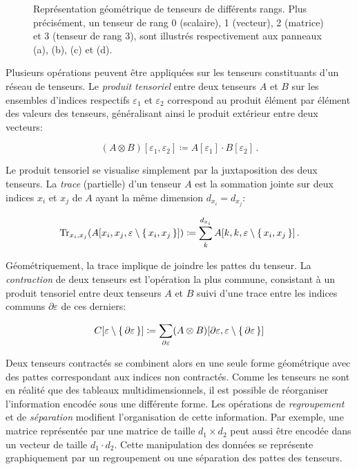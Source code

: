 \begin{figure}[h]
\begin{subfigure}[h]{0.2\textwidth}
        \label{fig:tensor-rank-3}
    \end{subfigure}
    \caption[Représentation géométrique des tenseurs]{Représentation géométrique de tenseurs de différents rangs. Plus précisément, un tenseur de rang 0 (scalaire), 1 (vecteur), 2 (matrice) et 3 (tenseur de rang 3), sont illustrés respectivement aux panneaux (a), (b), (c) et (d).}
    \label{fig:tensor} 
\end{figure}

Plusieurs opérations peuvent être appliquées sur les tenseurs constituants d'un réseau de tenseurs. Le \textit{produit tensoriel} entre deux tenseurs $A$ et $B$ sur les ensembles d'indices respectifs $\varepsilon_{1}$ et $\varepsilon_{2}$ correspond au produit élément par élément des valeurs des tenseurs, généralisant ainsi le produit extérieur entre deux vecteurs:

\begin{equation}
    (A \otimes B)[\varepsilon_{1}, \varepsilon_{2}] \coloneq A[\varepsilon_{1}] \cdot B[\varepsilon_{2}] \,.
\end{equation}

Le produit tensoriel se visualise simplement par la juxtaposition des deux tenseurs. La \textit{trace} (partielle) d'un tenseur $A$ est la sommation jointe sur deux indices $x_{i}$ et $x_{j}$ de $A$ ayant la même dimension $d_{x_{i}} = d_{x_{j}}$:

\begin{equation}
    \text{Tr}_{x_{i}, x_{j}} (A[x_{i}, x_{j}, \varepsilon \setminus \set{x_{i}, x_{j}}]) \coloneq \sum_{k}^{d_{x_{i}}} A[k, k, \varepsilon \setminus \set{x_{i}, x_{j}} ] \,. 
\end{equation}

Géométriquement, la trace implique de joindre les pattes du tenseur. La \textit{contraction} de deux tenseurs est l'opération la plus commune, consistant à un produit tensoriel entre deux tenseurs $A$ et $B$ suivi d'une trace entre les indices communs $\partial \varepsilon$ de ces derniers:

\begin{equation}
    C[\varepsilon \setminus \set{ \partial \varepsilon}] \coloneq  \sum_{\partial \varepsilon} (A \otimes B)[\partial \varepsilon,  \varepsilon \setminus \set{ \partial \varepsilon}]
\end{equation}

Deux tenseurs contractés se combinent alors en une seule forme géométrique avec des pattes correspondant aux indices non contractés. Comme les tenseurs ne sont en réalité que des tableaux multidimensionnels, il est possible de réorganiser l'information encodée sous une différente forme. Les opérations de \textit{regroupement} et de \textit{séparation} modifient l'organisation de cette information. Par exemple, une matrice représentée par une matrice de taille $d_{1} \times d_{2}$ peut aussi être encodée dans un vecteur de taille $d_{1} \cdot d_{2}$. Cette manipulation des données se représente graphiquement par un regroupement ou une séparation des pattes des tenseurs.

